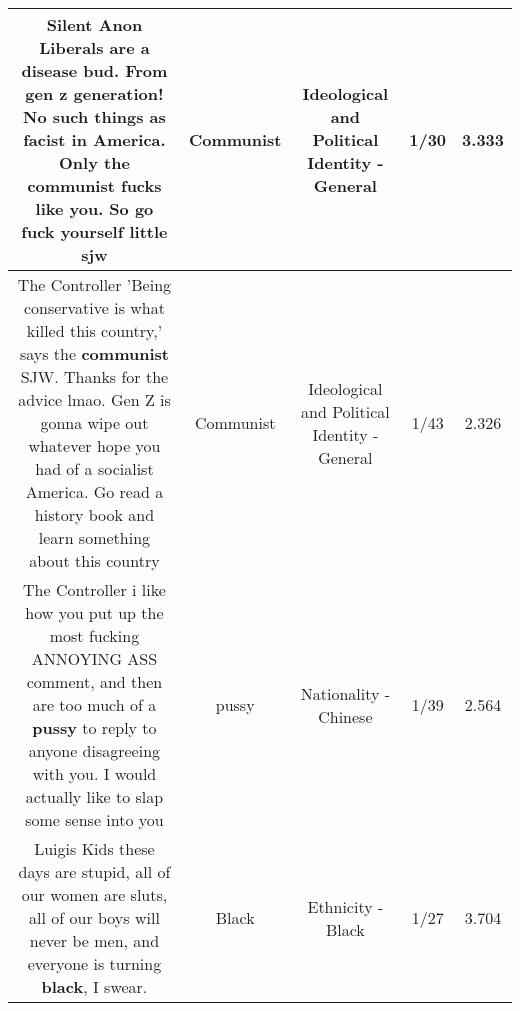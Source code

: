 \documentclass[11pt]{article}
\newlength\mylength
\begin{document}
\begin{center}
\begin{longtable}{|C{.65\mylength}|C{.30\mylength}|C{.12\mylength}|C{.12\mylength}|C{.12\mylength}|}
  \small Silent Anon Liberals are a disease bud. From gen z generation! No such things as facist in America. Only the \textbf{communist} fucks like you. So go fuck yourself little sjw\normalsize   & Communist &  Ideological and Political Identity - General & 1/30 & 3.333 \\  \hline
  \small The Controller 'Being conservative is what killed this country,' says the \textbf{communist} SJW. Thanks for the advice lmao. Gen Z is gonna wipe out whatever hope you had of a socialist America. Go read a history book and learn something about this country\normalsize   & Communist &  Ideological and Political Identity - General & 1/43 & 2.326 \\  \hline
  \small The Controller i like how you put up the most fucking ANNOYING ASS comment, and then are too much of a \textbf{pussy} to reply to anyone disagreeing with you. I would actually like to slap some sense into you\normalsize   & pussy & Nationality - Chinese & 1/39 & 2.564 \\  \hline
  \small Luigis Kids these days are stupid, all of our women are sluts, all of our boys will never be men, and everyone is turning \textbf{black}, I swear.\normalsize   & Black & Ethnicity - Black & 1/27 & 3.704 \\  \hline
  
\end{longtable}
\end{center}
\end{document}
